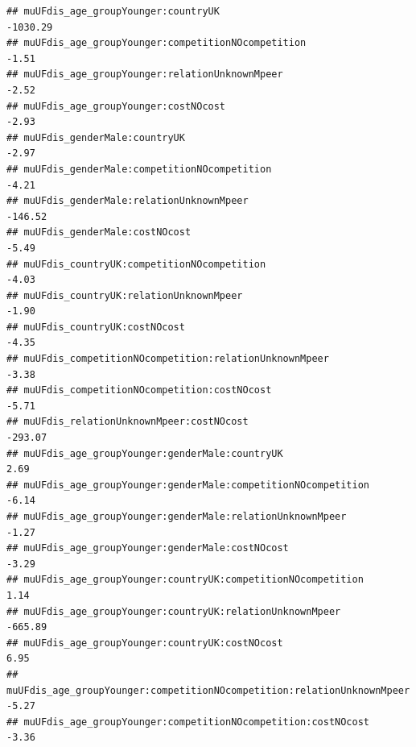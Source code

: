 \documentclass[
]{article}
\begin{document}
\begin{verbatim}
## muUFdis_age_groupYounger:countryUK                                                                     -1030.29
## muUFdis_age_groupYounger:competitionNOcompetition                                                         -1.51
## muUFdis_age_groupYounger:relationUnknownMpeer                                                             -2.52
## muUFdis_age_groupYounger:costNOcost                                                                       -2.93
## muUFdis_genderMale:countryUK                                                                              -2.97
## muUFdis_genderMale:competitionNOcompetition                                                               -4.21
## muUFdis_genderMale:relationUnknownMpeer                                                                 -146.52
## muUFdis_genderMale:costNOcost                                                                             -5.49
## muUFdis_countryUK:competitionNOcompetition                                                                -4.03
## muUFdis_countryUK:relationUnknownMpeer                                                                    -1.90
## muUFdis_countryUK:costNOcost                                                                              -4.35
## muUFdis_competitionNOcompetition:relationUnknownMpeer                                                     -3.38
## muUFdis_competitionNOcompetition:costNOcost                                                               -5.71
## muUFdis_relationUnknownMpeer:costNOcost                                                                 -293.07
## muUFdis_age_groupYounger:genderMale:countryUK                                                              2.69
## muUFdis_age_groupYounger:genderMale:competitionNOcompetition                                              -6.14
## muUFdis_age_groupYounger:genderMale:relationUnknownMpeer                                                  -1.27
## muUFdis_age_groupYounger:genderMale:costNOcost                                                            -3.29
## muUFdis_age_groupYounger:countryUK:competitionNOcompetition                                                1.14
## muUFdis_age_groupYounger:countryUK:relationUnknownMpeer                                                 -665.89
## muUFdis_age_groupYounger:countryUK:costNOcost                                                              6.95
## muUFdis_age_groupYounger:competitionNOcompetition:relationUnknownMpeer                                    -5.27
## muUFdis_age_groupYounger:competitionNOcompetition:costNOcost                                              -3.36

\end{verbatim}
\end{document}
